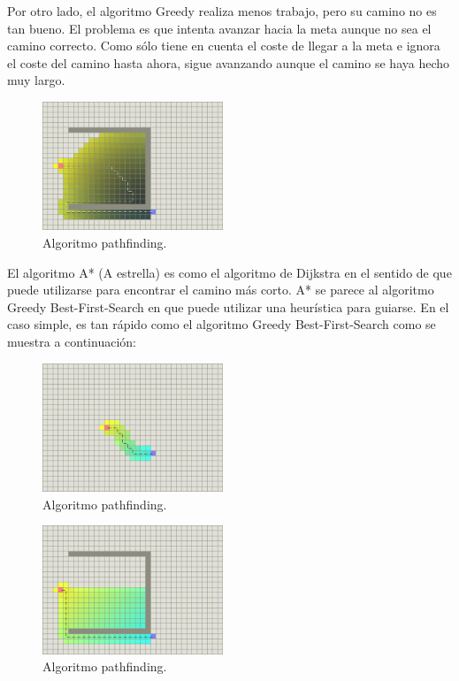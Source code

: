 \documentclass[reprint,amsmath,amssymb,aps]{revtex4-2}
\begin{document}
Por otro lado, el algoritmo Greedy realiza menos trabajo, pero su camino no es tan bueno. El problema es que intenta avanzar hacia la meta aunque no sea el camino correcto. Como sólo tiene en cuenta el coste de llegar a la meta e ignora el coste del camino hasta ahora, sigue avanzando aunque el camino se haya hecho muy largo.
 
\begin{figure}[H]
 	\centering
 	\includegraphics[width=0.48\textwidth]{greedy-trap.png}
 	\caption{Algoritmo pathfinding.}
 	\label{a-trap}
\end{figure}


El algoritmo A* (A estrella) es como el algoritmo de Dijkstra en el sentido de que puede utilizarse para encontrar el camino más corto. A* se parece al algoritmo Greedy Best-First-Search en que puede utilizar una heurística para guiarse. En el caso simple, es tan rápido como el algoritmo Greedy Best-First-Search como se muestra a continuación:

\begin{figure}[H]
	\centering
	\includegraphics[width=0.48\textwidth]{a-star.png}
	\caption{Algoritmo pathfinding.}
	\label{a-trap}
\end{figure}

\begin{figure}[H]
	\centering
	\includegraphics[width=0.48\textwidth]{a-star-trap.png}
	\caption{Algoritmo pathfinding.}
	\label{a-trap}
\end{figure}
\end{document}
